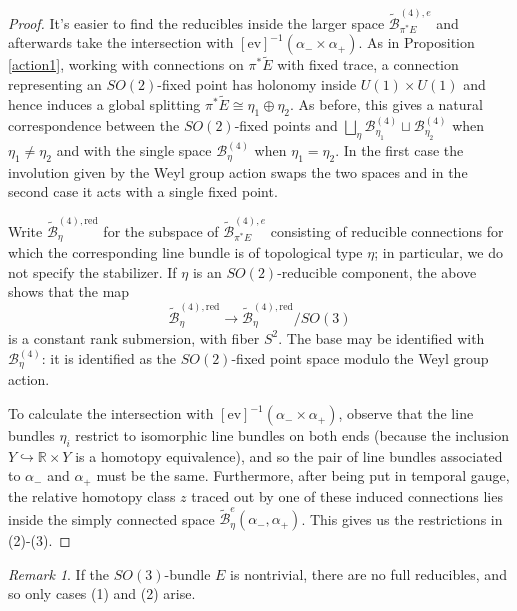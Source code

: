 \documentclass{memo-l}
\newcommand{\pE}{\pi^* \! E}
\theoremstyle{definition}
\theoremstyle{remark}
\newtheorem{remark}[theorem]{Remark}
\numberwithin{section}{chapter}
\numberwithin{equation}{chapter}
\begin{document}
\begin{proof}It's easier to find the reducibles inside the larger space $\widetilde{\mathcal B}^{(4),e}_{\pE}$ and afterwards take the intersection with $[\text{ev}]^{-1}(\alpha_- \times \alpha_+)$. As in Proposition \ref{action1}, working with connections on $\pi^*\tilde E$ with fixed trace, a connection representing an $SO(2)$-fixed point has holonomy inside $U(1) \times U(1)$ and hence induces a global splitting $\pi^* \tilde E \cong \eta_1 \oplus \eta_2$. As before, this gives a natural correspondence between the $SO(2)$-fixed points and $\bigsqcup_\eta \mathcal B^{(4)}_{\eta_1} \sqcup \mathcal B^{(4)}_{\eta_2}$ when $\eta_1 \neq \eta_2$ and with the single space $\mathcal B^{(4)}_\eta$ when $\eta_1 = \eta_2$. In the first case the involution given by the Weyl group action swaps the two spaces and in the second case it acts with a single fixed point. 

Write $\widetilde{\mathcal B}^{(4),\text{red}}_\eta$ for the subspace of $\widetilde{\mathcal B}^{(4),e}_{\pE}$ consisting of reducible connections for which the corresponding line bundle is of topological type $\eta$; in particular, we do not specify the stabilizer. If $\eta$ is an $SO(2)$-reducible component, the above shows that the map $$\widetilde{\mathcal B}^{(4),\text{red}}_\eta \to \widetilde{\mathcal B}^{(4),\text{red}}_\eta/SO(3)$$ is a constant rank submersion, with fiber $S^2$. The base may be identified with $\mathcal B^{(4)}_\eta$: it is identified as the $SO(2)$-fixed point space modulo the Weyl group action.

To calculate the intersection with $[\text{ev}]^{-1}(\alpha_- \times \alpha_+)$, observe that the line bundles $\eta_i$ restrict to isomorphic line bundles on both ends (because the inclusion $Y \hookrightarrow \mathbb R \times Y$ is a homotopy equivalence), and so the pair of line bundles associated to $\alpha_-$ and $\alpha_+$ must be the same. Furthermore, after being put in temporal gauge, the relative homotopy class $z$ traced out by one of these induced connections lies inside the simply connected space $\widetilde{\mathcal B}^{e}_{\eta}(\alpha_-, \alpha_+)$. This gives us the restrictions in (2)-(3).
\end{proof}

\begin{remark}If the $SO(3)$-bundle $E$ is nontrivial, there are no full reducibles, and so only cases (1) and (2) arise.
\end{remark}
\end{document}
